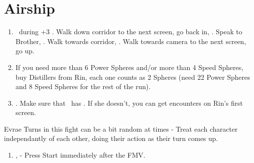 \chapter{Airship}

\begin{enumerate}
	\item \sd\ during \cs+3 \skippablefmv. Walk down corridor to the next screen, go back in, \sd. Speak to Brother, \sd. Walk towards corridor, \sd. Walk towards camera to the next screen, go up.
	\item If you need more than 6 Power Spheres and/or more than 4 Speed Spheres, buy Distillers from Rin, each one counts as 2 Spheres (need 22 Power Spheres and 8 Speed Spheres for the rest of the run).
	\item \save. Make sure that \rikku\ has \od. If she doesn't, you can get encounters on Rin's first screen.
\end{enumerate}
\begin{battle}[32000]{Evrae}
	Turns in this fight can be a bit random at times - Treat each character independantly of each other, doing their action as their turn comes up.
	\begin{itemize}
	\end{itemize}
\end{battle}
\begin{enumerate}[resume]
	\item \sd, \skippablefmv[3:00] - Press Start immediately after the FMV.
\end{enumerate}